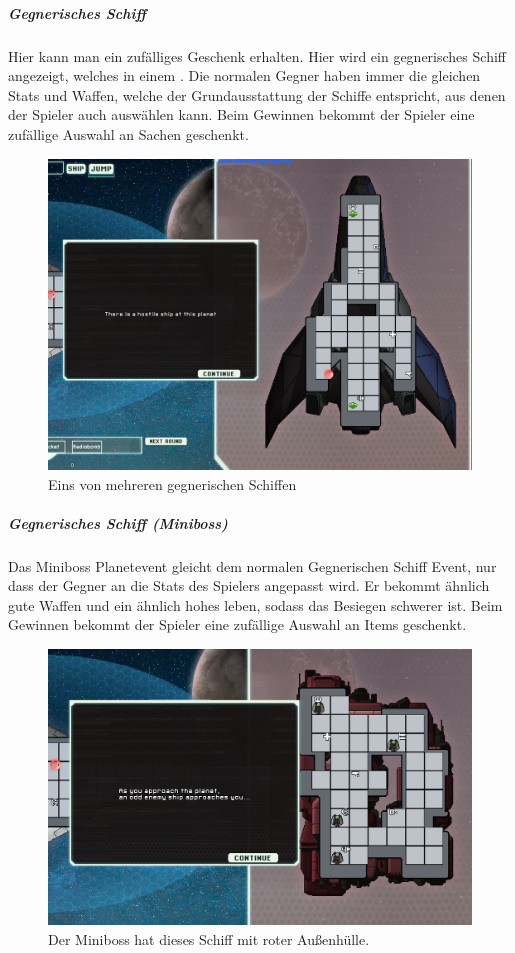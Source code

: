 \documentclass[fontsize=12pt,paper=a4,twoside]{scrartcl}
\begin{document}
\subparagraph{Gegnerisches Schiff} Hier kann man ein zufälliges Geschenk erhalten. Hier wird ein gegnerisches Schiff angezeigt, welches in einem . Die normalen Gegner haben immer die gleichen Stats und Waffen, welche der Grundausstattung der Schiffe entspricht, aus denen der Spieler auch auswählen kann. Beim Gewinnen bekommt der Spieler eine zufällige Auswahl an Sachen geschenkt. 

\begin{figure}[H]
\centering
\includegraphics[width=1\linewidth]{DasSpiel/Karte/enemy.png}
\caption{Eins von mehreren gegnerischen Schiffen}
\end{figure} 


\subparagraph{Gegnerisches Schiff (Miniboss)} Das Miniboss Planetevent gleicht dem normalen Gegnerischen Schiff Event, nur dass der Gegner an die Stats des Spielers angepasst wird. Er bekommt ähnlich gute Waffen und ein ähnlich hohes leben, sodass das Besiegen schwerer ist. Beim Gewinnen bekommt der Spieler eine zufällige Auswahl an Items geschenkt. 

\begin{figure}[H]
\centering
\includegraphics[width=1\linewidth]{DasSpiel/Karte/miniboss.png}
\caption{Der Miniboss hat dieses Schiff mit roter Außenhülle.}
\end{figure} 
\end{document}
